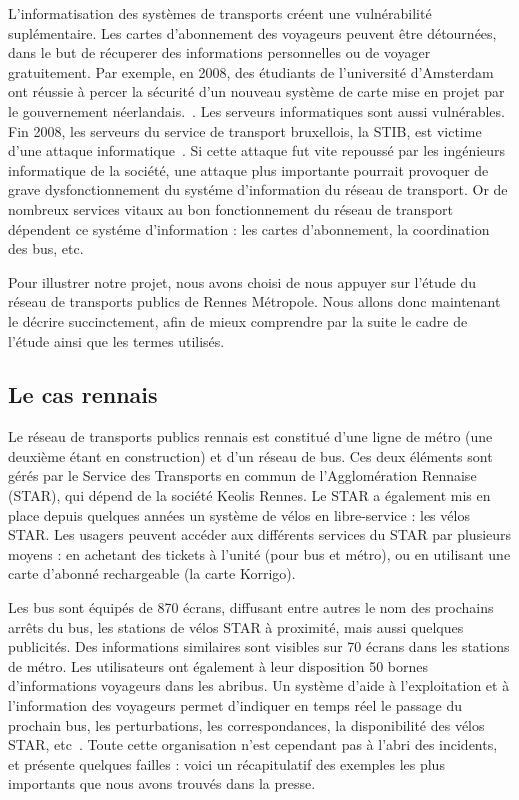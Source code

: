     	L'informatisation des systèmes de transports créent une vulnérabilité suplémentaire. Les cartes d'abonnement des voyageurs peuvent être détournées, dans le but de récuperer des informations personnelles ou de voyager gratuitement. Par exemple, en 2008, des étudiants de l'université d'Amsterdam ont réussie à percer la sécurité d'un nouveau système de carte mise en projet par le gouvernement néerlandais.~\cite{Amst_RFID}. Les serveurs informatiques sont aussi vulnérables. Fin 2008, les serveurs du service de transport bruxellois, la STIB, est victime d'une attaque informatique~\cite{STIB}. Si cette attaque fut vite repoussé par les ingénieurs informatique de la société, une attaque plus importante pourrait provoquer de grave dysfonctionnement du systéme d'information du réseau de transport. Or de nombreux services vitaux au bon fonctionnement du réseau de transport dépendent ce systéme d'information : les cartes d'abonnement, la coordination des bus, etc.

    	Pour illustrer notre projet, nous avons choisi de nous appuyer sur l'étude du réseau de transports publics de Rennes Métropole. Nous allons donc maintenant le décrire succinctement, afin de mieux comprendre par la suite le cadre de l'étude ainsi que les termes utilisés.
                
    \subsection{Le cas rennais}
    	Le réseau de transports publics rennais est constitué d'une ligne de métro (une deuxième étant en construction) et d'un réseau de bus. Ces deux éléments sont gérés par le Service des Transports en commun de l'Agglomération Rennaise (STAR), qui dépend de la société Keolis Rennes. Le STAR a également mis en place depuis quelques années un système de vélos en libre-service : les vélos STAR. Les usagers peuvent accéder aux différents services du STAR par plusieurs moyens : en achetant des tickets à l'unité (pour bus et métro), ou en utilisant une carte d'abonné rechargeable (la carte Korrigo). 

        Les bus sont équipés de 870 écrans, diffusant entre autres le nom des prochains arrêts du bus, les stations de vélos STAR à proximité, mais aussi quelques publicités. Des informations similaires sont visibles sur 70 écrans dans les stations de métro. Les utilisateurs ont également à leur disposition 50 bornes d’informations voyageurs dans les abribus. Un système d’aide à l’exploitation et à l’information des voyageurs permet d’indiquer en temps réel le passage du prochain bus, les perturbations, les correspondances, la disponibilité des vélos STAR, etc~\cite{chiffres_star}. Toute cette organisation n'est cependant pas à l'abri des incidents, et présente quelques failles : voici un récapitulatif des exemples les plus importants que nous avons trouvés dans la presse. 
        
